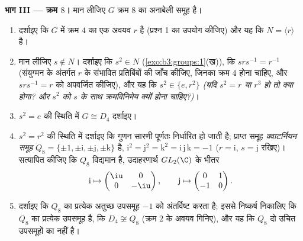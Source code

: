 \begin{problem}
\medskip
\noindent\textbf{भाग III --- क्रम $8$।} मान लीजिए $G$
क्रम $8$ का अनाबेली समूह है।
\begin{enumerate}[resume]
  \item दर्शाइए कि $G$ में क्रम $4$ का एक अवयव $r$ है
        (प्रश्न 1 का उपयोग कीजिए) और यह कि $N = \langle r\rangle$  है।
  \item मान लीजिए $s \notin N$। दर्शाइए कि $s^2 \in N$ (\cref{exo:b3:groups:1}(ख)), कि
        $srs^{-1} = r^{-1}$ (संयुग्मन के अंतर्गत $r$ के संभावित प्रतिबिंबों
        की जाँच कीजिए, जिनका क्रम 4 होना चाहिए, और $srs^{-1} = r$ को
        अपवर्जित कीजिए), और यह कि $s^2 \in \{e, r^2\}$ \emph{(यदि $s^2 = r$ या
        $r^3$ हो तो क्या होगा? और $s^2$ को $s$ के साथ
        क्रमविनिमेय क्यों होना चाहिए?)}।
  \item $s^2 = e$ की स्थिति में $G \cong D_4$ दर्शाइए।
  \item $s^2 = r^2$ की स्थिति में दर्शाइए कि गुणन सारणी पूर्णतः
        निर्धारित हो जाती है; प्राप्त समूह \emph{क्वाटर्नियन
        समूह} $Q_8 =
        \{\pm 1, \pm \mathrm i, \pm \mathrm j, \pm \mathrm k\}$ है, $\mathrm i^2 = \mathrm j^2 = \mathrm k^2 = \mathrm i\,
        \mathrm j\,\mathrm k = -1$ ($r = \mathrm i$,
        $s =
        \mathrm j$ रखिए)। सत्यापित कीजिए कि $Q_8$ विद्यमान है,
        उदाहरणार्थ $GL_2(\C)$ के भीतर
        \[
        \mathrm i \mapsto \begin{pmatrix} \iu & 0\\ 0 & -\iu
        \end{pmatrix},
        \qquad
        \mathrm j \mapsto \begin{pmatrix} 0 & 1\\ -1 & 0
        \end{pmatrix}.
        \]
  \item दर्शाइए कि $Q_8$ का प्रत्येक अतुच्छ उपसमूह $-1$ को
        अंतर्विष्ट करता है; इससे निष्कर्ष निकालिए कि $Q_8$ का
        प्रत्येक उपसमूह  है, कि $D_4 \not\cong Q_8$ (क्रम $2$ के
        अवयव गिनिए), और यह कि $Q_8$ दो उचित उपसमूहों का
         नहीं है।
\end{enumerate}


\end{problem}

